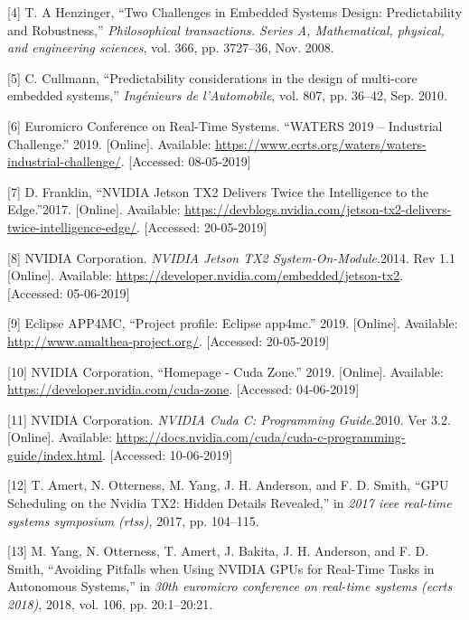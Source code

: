 \documentclass[
  12pt,
  a4paperpaper,
]{report}
\begin{document}
\leavevmode\hypertarget{ref-Henzinger2008}{}%
{[}4{]} T. A Henzinger, ``Two Challenges in Embedded Systems Design:
Predictability and Robustness,'' \emph{Philosophical transactions.
Series A, Mathematical, physical, and engineering sciences}, vol. 366,
pp. 3727--36, Nov. 2008.

\leavevmode\hypertarget{ref-Cullmann2010}{}%
{[}5{]} C. Cullmann, ``Predictability considerations in
the design of multi-core embedded systems,'' \emph{Ingénieurs de
l'Automobile}, vol. 807, pp. 36--42, Sep. 2010.

\leavevmode\hypertarget{ref-Water2019Url}{}%
{[}6{]} Euromicro Conference on Real-Time Systems. ``WATERS 2019 -- Industrial Challenge.'' 2019. [Online]. Available: 
\url{https://www.ecrts.org/waters/waters-industrial-challenge/}. [Accessed: 08-05-2019] 

\leavevmode\hypertarget{ref-TX2Intro2017}{}%
{[}7{]} D. Franklin, ``NVIDIA Jetson TX2 Delivers Twice the Intelligence
to the Edge.''2017. [Online]. Available: 
\url{https://devblogs.nvidia.com/jetson-tx2-delivers-twice-intelligence-edge/}. [Accessed: 20-05-2019] 

\leavevmode\hypertarget{ref-TX2Datasheet2014}{}%
{[}8{]} NVIDIA Corporation. \emph{NVIDIA Jetson TX2 System-On-Module}.2014. Rev 1.1 [Online]. Available: \url{https://developer.nvidia.com/embedded/jetson-tx2}. [Accessed: 05-06-2019]

\leavevmode\hypertarget{ref-Amalthea2019}{}%
{[}9{]} Eclipse APP4MC, ``Project profile: Eclipse app4mc.'' 2019. [Online]. Available: 
\url{http://www.amalthea-project.org/}. [Accessed: 20-05-2019] 

\leavevmode\hypertarget{ref-CUDAZONE2019}{}%
{[}10{]} NVIDIA Corporation, ``Homepage - Cuda Zone.'' 2019. [Online]. Available: 
\url{https://developer.nvidia.com/cuda-zone}. [Accessed: 04-06-2019] 

\leavevmode\hypertarget{ref-CCUDA2010}{}%
{[}11{]} NVIDIA Corporation. \emph{NVIDIA Cuda C: Programming Guide}.2010. Ver 3.2. [Online]. Available: \url{https://docs.nvidia.com/cuda/cuda-c-programming-guide/index.html}. [Accessed: 10-06-2019]  

\leavevmode\hypertarget{ref-amert2017gpu}{}%
{[}12{]} T. Amert, N. Otterness, M. Yang, J. H. Anderson, and F. D.
Smith, ``GPU Scheduling on the Nvidia TX2: Hidden Details Revealed,'' in
\emph{2017 ieee real-time systems symposium (rtss)}, 2017, pp. 104--115.

\leavevmode\hypertarget{ref-yang2018}{}%
{[}13{]} M. Yang, N. Otterness, T. Amert, J. Bakita, J. H. Anderson, and
F. D. Smith, ``Avoiding Pitfalls when Using NVIDIA GPUs for Real-Time
Tasks in Autonomous Systems,'' in \emph{30th euromicro conference on
real-time systems (ecrts 2018)}, 2018, vol. 106, pp. 20:1--20:21.
\end{document}
